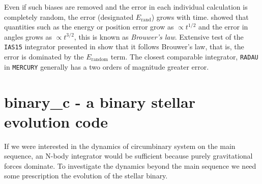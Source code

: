 \documentclass[twoside,openright,titlepage,numbers=noenddot,headinclude,%
                footinclude=true,cleardoublepage=empty,abstractoff, 
                BCOR=5mm,paper=a4,fontsize=11pt,%
                american,%
                ]{scrreprt}%
\begin{document}
Even if such biases are removed and the error in each individual calculation is
completely random, the error (designated $E_\text{rand}$) grows with time. 
\citet{brouwer} showed that  quantities such as the energy  or position error
grow as $\propto t^{1/2}$ and the error in angles grows as $\propto t^{3/2}$,
this is known as \emph{Brouwer's law}.
Extensive test of the \texttt{IAS15} integrator presented in \citet{Rein2014} 
show that it follows Brouwer's law, that is, the error is dominated by the 
$E_\text{random}$ term. The closest comparable integrator, \texttt{RADAU}
in \texttt{MERCURY} generally has a two orders of magnitude greater error. 

\section{binary\_c - a binary stellar evolution code}
\label{sec:binary_c}
If we were interested in the dynamics of circumbinary system on the main 
sequence, an N-body integrator would be sufficient because purely gravitational
forces dominate. To investigate the dynamics beyond the main sequence we 
need some prescription the evolution of the stellar binary. 
\end{document}
